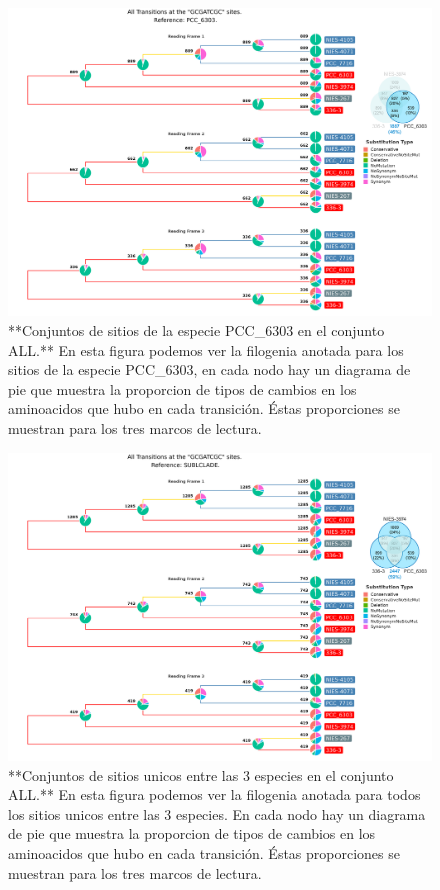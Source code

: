 \documentclass[
]{book}
\begin{document}
\begin{figure}

{\centering \includegraphics[width=1.2\linewidth]{Clados/Calothrix_B/figures/A/GCGATCGC/All/PCC_6303_All_A_tree} 

}

\caption{**Conjuntos de sitios de la especie PCC\_6303 en el conjunto ALL.** En esta figura podemos ver la filogenia anotada para los sitios de la especie PCC\_6303, en cada nodo hay un diagrama de pie que muestra la proporcion de tipos de cambios en los aminoacidos que hubo en cada transición. Éstas proporciones se muestran para los tres marcos de lectura.}\label{fig:FIG15x}
\end{figure}

\begin{figure}

{\centering \includegraphics[width=1.2\linewidth]{Clados/Calothrix_B/figures/A/GCGATCGC/All/SUBCLADE_All_A_tree} 

}

\caption{**Conjuntos de sitios unicos entre las 3 especies en el conjunto ALL.** En esta figura podemos ver la filogenia anotada para todos los sitios unicos entre las 3 especies. En cada nodo hay un diagrama de pie que muestra la proporcion de tipos de cambios en los aminoacidos que hubo en cada transición. Éstas proporciones se muestran para los tres marcos de lectura.}\label{fig:FIG16x}
\end{figure}
\end{document}

